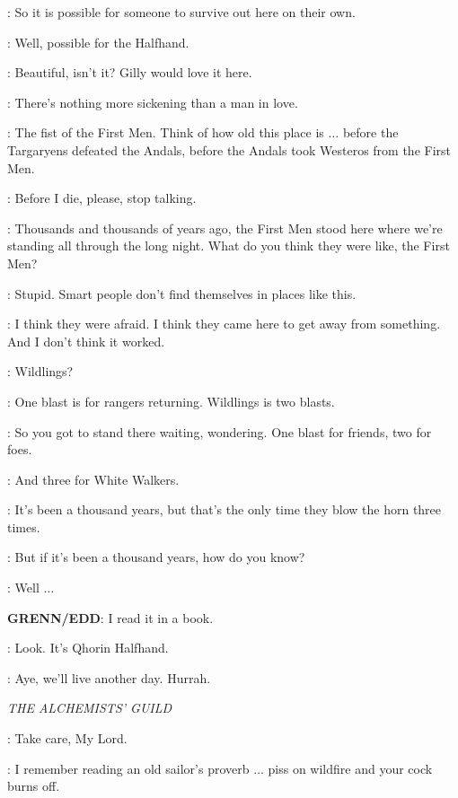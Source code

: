 \JON: So it is possible for someone to survive out here on their own. 

\JEOR: Well, possible for the Halfhand. 

\SAM: Beautiful, isn't it? Gilly would love it here. 

\EDD: There's nothing more sickening than a man in love. 


\SAM: The fist of the First Men. Think of how old this place is $\ldots$ before the Targaryens defeated the Andals, before the Andals took Westeros from the First Men. 

\EDD: Before I die, please, stop talking. 

\SAM: Thousands and thousands of years ago, the First Men stood here where we're standing all through the long night. What do you think they were like, the First Men? 

\EDD: Stupid. Smart people don't find themselves in places like this. 

\JON: I think they were afraid. I think they came here to get away from something. And I don't think it worked. 


\GRENN: Wildlings? 

\JON: One blast is for rangers returning. Wildlings is two blasts. 

\EDD: So you got to stand there waiting, wondering. One blast for friends, two for foes. 

\SAM: And three for White Walkers. 


\SAM: It's been a thousand years, but that's the only time they blow the horn three times. 

\GRENN: But if it's been a thousand years, how do you know? 

\SAM: Well $\ldots$ 

\textbf{GRENN/EDD}: I read it in a book. 

\JON: Look. It's Qhorin Halfhand. 

\EDD: Aye, we'll live another day. Hurrah. 


\scene

\textit{THE ALCHEMISTS' GUILD}


\HALLYN: Take care, My Lord. 

\TYRION: I remember reading an old sailor's proverb $\ldots$ piss on wildfire and your cock burns off. 

